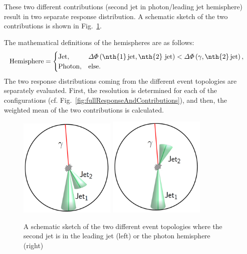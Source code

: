 These two different contributions (second jet in photon/leading jet hemisphere) result in two separate response distribution.
A schematic sketch of the two contributions is shown in Fig.~\ref{fig:sketch}. 



The mathematical definitions of the hemispheres are as follows:
\begin{equation}\label{eq:HemisphereDefinition}
\text{Hemisphere} = \begin{cases}
  \text{Jet},    & \Delta \Phi \left( \text{\nth{1}\,jet,\,\nth{2} jet} \right) < \Delta \Phi \left( \gamma \text{,\,\nth{2}\,jet} \right) , \\
  \text{Photon}, & \text{else}.\\
\end{cases}
\end{equation}
The two response distributions coming from the different event topologies are separately evaluated. First, the resolution is determined for each of the configurations 
(cf. Fig.~\ref{fig:fullResponseAndContributions}), and then, the weighted mean of the two contributions is calculated.
\begin{figure}[!t]
 \centering
     \includegraphics[width=0.42\textwidth]{figures/resolution/methodology/2ndJet_in_JetHemisphere.pdf}
     \hspace{0.1\textwidth}
     \includegraphics[width=0.42\textwidth]{figures/resolution/methodology/2ndJet_in_PhotonHemisphere.pdf}
  \caption{A schematic sketch of the two different event topologies where the second jet is in the leading jet (left) or the photon hemisphere (right)}  
 \label{fig:sketch}
\end{figure}
